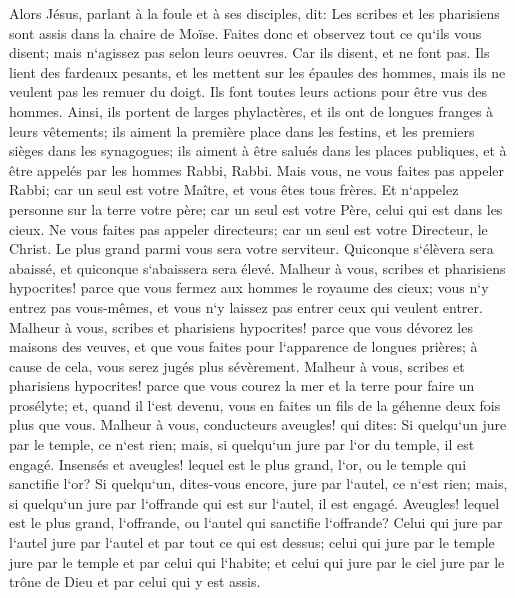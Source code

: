 \verse Alors Jésus, parlant à la foule et à ses disciples, dit: 
\verse Les scribes et les pharisiens sont assis dans la chaire de Moïse. 
\verse Faites donc et observez tout ce qu`ils vous disent; mais n`agissez pas selon leurs oeuvres. Car ils disent, et ne font pas. 
\verse Ils lient des fardeaux pesants, et les mettent sur les épaules des hommes, mais ils ne veulent pas les remuer du doigt. 
\verse Ils font toutes leurs actions pour être vus des hommes. Ainsi, ils portent de larges phylactères, et ils ont de longues franges à leurs vêtements; 
\verse ils aiment la première place dans les festins, et les premiers sièges dans les synagogues; 
\verse ils aiment à être salués dans les places publiques, et à être appelés par les hommes Rabbi, Rabbi. 
\verse Mais vous, ne vous faites pas appeler Rabbi; car un seul est votre Maître, et vous êtes tous frères. 
\verse Et n`appelez personne sur la terre votre père; car un seul est votre Père, celui qui est dans les cieux. 
\verse Ne vous faites pas appeler directeurs; car un seul est votre Directeur, le Christ. 
\verse Le plus grand parmi vous sera votre serviteur. 
\verse Quiconque s`élèvera sera abaissé, et quiconque s`abaissera sera élevé. 
\verse Malheur à vous, scribes et pharisiens hypocrites! parce que vous fermez aux hommes le royaume des cieux; vous n`y entrez pas vous-mêmes, et vous n`y laissez pas entrer ceux qui veulent entrer. 
\verse Malheur à vous, scribes et pharisiens hypocrites! parce que vous dévorez les maisons des veuves, et que vous faites pour l`apparence de longues prières; à cause de cela, vous serez jugés plus sévèrement. 
\verse Malheur à vous, scribes et pharisiens hypocrites! parce que vous courez la mer et la terre pour faire un prosélyte; et, quand il l`est devenu, vous en faites un fils de la géhenne deux fois plus que vous. 
\verse Malheur à vous, conducteurs aveugles! qui dites: Si quelqu`un jure par le temple, ce n`est rien; mais, si quelqu`un jure par l`or du temple, il est engagé. 
\verse Insensés et aveugles! lequel est le plus grand, l`or, ou le temple qui sanctifie l`or? 
\verse Si quelqu`un, dites-vous encore, jure par l`autel, ce n`est rien; mais, si quelqu`un jure par l`offrande qui est sur l`autel, il est engagé. 
\verse Aveugles! lequel est le plus grand, l`offrande, ou l`autel qui sanctifie l`offrande? 
\verse Celui qui jure par l`autel jure par l`autel et par tout ce qui est dessus; 
\verse celui qui jure par le temple jure par le temple et par celui qui l`habite; 
\verse et celui qui jure par le ciel jure par le trône de Dieu et par celui qui y est assis. 
